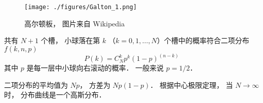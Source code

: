 

\begin{figure}[ht]
\centering
\texttt{[image: ./figures/Galton\_1.png]}
\caption{高尔顿板， 图片来自 Wikipedia} \label{Galton_fig1}
\end{figure}

共有 $N+1$ 个槽， 小球落在第 $k$ （$k = 0,1,\dots,N$）个槽中的概率符合二项分布 $f(k,n,p)$
\begin{equation}
P(k) = C_N^k p^k (1-p)^{(n-k)}
\end{equation}
其中 $p$ 是每一层中小球向右滚动的概率． 一般来说 $p = 1/2$．

二项分布的平均值为 $Np$， 方差为 $Np(1-p)$． 根据中心极限定理， 当 $N\to\infty$ 时， 分布曲线是一个高斯分布．
